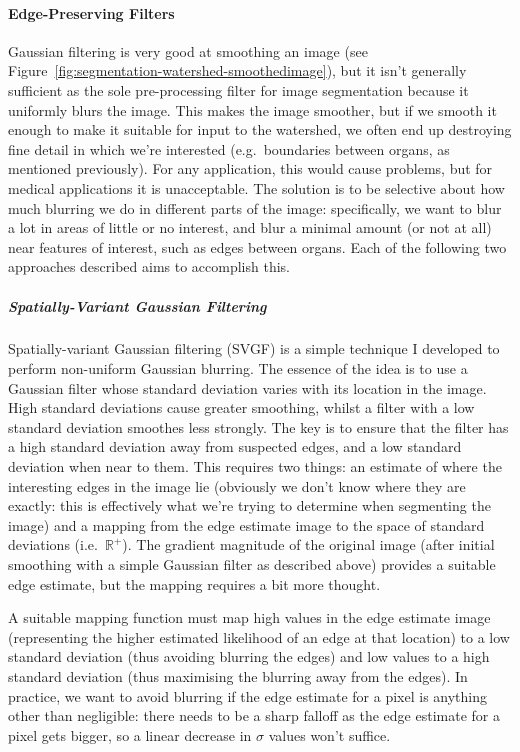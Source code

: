 \paragraph{Edge-Preserving Filters}

Gaussian filtering is very good at smoothing an image (see Figure~\ref{fig:segmentation-watershed-smoothedimage}), but it isn't generally sufficient as the sole pre-processing filter for image segmentation because it uniformly blurs the image. This makes the image smoother, but if we smooth it enough to make it suitable for input to the watershed, we often end up destroying fine detail in which we're interested (e.g.~boundaries between organs, as mentioned previously). For any application, this would cause problems, but for medical applications it is unacceptable. The solution is to be selective about how much blurring we do in different parts of the image: specifically, we want to blur a lot in areas of little or no interest, and blur a minimal amount (or not at all) near features of interest, such as edges between organs. Each of the following two approaches described aims to accomplish this.


\subparagraph{Spatially-Variant Gaussian Filtering}

Spatially-variant Gaussian filtering (SVGF) is a simple technique I developed to perform non-uniform Gaussian blurring. The essence of the idea is to use a Gaussian filter whose standard deviation varies with its location in the image. High standard deviations cause greater smoothing, whilst a filter with a low standard deviation smoothes less strongly. The key is to ensure that the filter has a high standard deviation away from suspected edges, and a low standard deviation when near to them. This requires two things: an estimate of where the interesting edges in the image lie (obviously we don't know where they are exactly: this is effectively what we're trying to determine when segmenting the image) and a mapping from the edge estimate image to the space of standard deviations (i.e.~$\mathbb{R}^+$). The gradient magnitude of the original image (after initial smoothing with a simple Gaussian filter as described above) provides a suitable edge estimate, but the mapping requires a bit more thought.

A suitable mapping function must map high values in the edge estimate image (representing the higher estimated likelihood of an edge at that location) to a low standard deviation (thus avoiding blurring the edges) and low values to a high standard deviation (thus maximising the blurring away from the edges). In practice, we want to avoid blurring if the edge estimate for a pixel is anything other than negligible: there needs to be a sharp falloff as the edge estimate for a pixel gets bigger, so a linear decrease in $\sigma$ values won't suffice.

